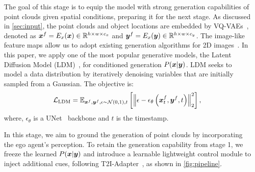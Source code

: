 The goal of this stage is to equip the model with strong generation capabilities of point clouds given spatial conditions, preparing it for the next stage. As discussed in \cref{sec:input}, the point clouds and object locations are embedded by VQ-VAEs~\citep{van2017neural}, denoted as ${\bm{x}}^f=E_x({\bm{x}}) \in {\mathbb{R}}^{h \times w \times c_x}$ and ${\bm{y}}^f=E_x({\bm{y}}) \in {\mathbb{R}}^{h \times w \times c_y}$. The image-like feature maps allow us to adopt existing generation algorithms for 2D images~\citep{dhariwal2021diffusion,ho2020denoising,kingma2021variational}. In this paper, we apply one of the most popular generative models, the Latent Diffusion Model (LDM)~\citep{rombach2022high}, for conditioned generation $P({\bm{x}}|{\bm{y}})$. LDM seeks to model a data distribution by iteratively denoising variables that are initially sampled from a Gaussian. The objective is:
\begin{equation}
    \mathcal{L}_{\text{LDM}} = {\mathbb{E}}_{{\bm{x}}^f, {\bm{y}}^f, \epsilon \sim {\mathcal{N}}(0,1), t}\left[\left\|\epsilon-\epsilon_\theta\left({\bm{x}}^f_t, {\bm{y}}^f, t\right)\right\|_2^2\right],
\label{eq:ldm}
\end{equation}
where, $\epsilon_\theta$ is a UNet~\citep{ronneberger2015u} backbone and $t$ is the timestamp.

 
 In this stage, we aim to ground the generation of point clouds by incorporating the ego agent's perception. To retain the generation capability from stage 1, we freeze the learned $P({\bm{x}}|{\bm{y}})$ 
and introduce a learnable lightweight control module to inject additional cues, following T2I-Adapter~\citep{mou2024t2i}, as shown in \cref{fig:pipeline}. 

